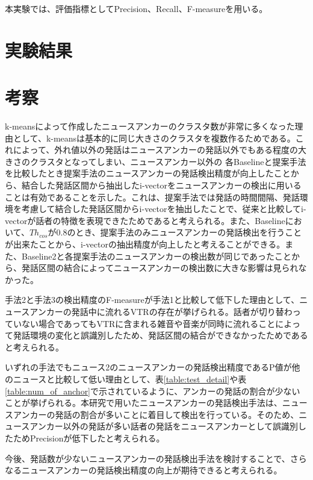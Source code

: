 本実験では、評価指標としてPrecision、Recall、F-measureを用いる。

\section{実験結果}








\section{考察}
k-meansによって作成したニュースアンカーのクラスタ数が非常に多くなった理由として、k-meansは基本的に同じ大きさのクラスタを複数作るためである。これによって、外れ値以外の発話はニュースアンカーの発話以外でもある程度の大きさのクラスタとなってしまい、ニュースアンカー以外の
各Baselineと提案手法を比較したとき提案手法のニュースアンカーの発話検出精度が向上したことから、結合した発話区間から抽出したi-vectorをニュースアンカーの検出に用いることは有効であることを示した。これは、提案手法では発話の時間間隔、発話環境を考慮して結合した発話区間からi-vectorを抽出したことで、従来と比較してi-vectorが話者の特徴を表現できたためであると考えられる。また、Baselineにおいて、$Th_{cos}$が0.8のとき、提案手法のみニュースアンカーの発話検出を行うことが出来たことから、i-vectorの抽出精度が向上したと考えることができる。また、Baseline2と各提案手法のニュースアンカーの検出数が同じであったことから、発話区間の結合によってニュースアンカーの検出数に大きな影響は見られなかった。\par
手法2と手法3の検出精度のF-measureが手法1と比較して低下した理由として、ニュースアンカーの発話中に流れるVTRの存在が挙げられる。話者が切り替わっていない場合であってもVTRに含まれる雑音や音楽が同時に流れることによって発話環境の変化と誤識別したため、発話区間の結合ができなかったためであると考えられる。\par
いずれの手法でもニュース2のニュースアンカーの発話検出精度であるP値が他のニュースと比較して低い理由として、表\ref{table:test_detail}や表\ref{table:num_of_anchor}で示されているように、アンカーの発話の割合が少ないことが挙げられる。本研究で用いたニュースアンカーの発話検出手法\cite{nozaki_gakuseikai}は、ニュースアンカーの発話の割合が多いことに着目して検出を行っている。そのため、ニュースアンカー以外の発話が多い話者の発話をニュースアンカーとして誤識別したためPrecisionが低下したと考えられる。\par
今後、発話数が少ないニュースアンカーの発話検出手法を検討することで、さらなるニュースアンカーの発話検出精度の向上が期待できると考えられる。\par
\begin{comment}
また、ニュースアンカーの発話検出精度の向上における音声認識への効果を検証するために、検出されたニュースアンカーの発話の音声認識実験を行った。音声認識システムの概要、実験の詳細を付録\ref{chapter:speech_recog}に記載する。音声認識実験の結果、インデクシングに十分な精度で音声認識が行われたとは言えないため、音声認識精度向上のために雑音除去や雑音に頑健な音声認識システムを構築する必要があると考えられる。
\end{comment}
